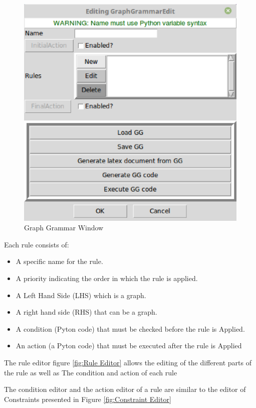 \begin{figure}[th]
	\centering 
	\includegraphics[scale=0.5]{chapiter3/img/gg}
	\caption{\label{fig:Graph Grammar Window}Graph Grammar Window}
\end{figure} 
 

 Each rule consists of: 
\begin{itemize}
\item  A specific name for the rule.
\item  A priority indicating the order in which the rule is applied.
\item  A Left Hand Side (LHS) which is a graph.
\item  A right hand side (RHS) that can be a graph.
\item  A condition (Pyton code) that must be checked before the rule is
Applied.
\item An action (a Pyton code) that must be executed after the rule is
Applied
\end{itemize}


The rule editor figure \ref{fig:Rule Editor} allows the editing of the different parts of the rule as well as
The condition and action of each rule 
 
 The condition editor and the action editor of a rule are similar to the editor of
Constraints presented in Figure \ref{fig:Constraint Editor}


